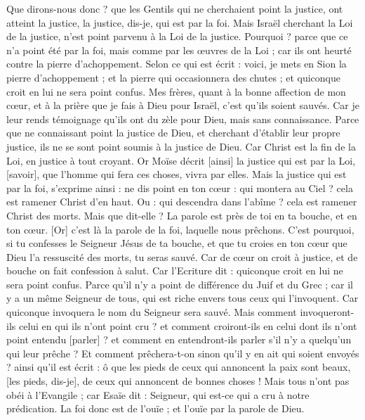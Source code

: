 \begin{multicols}{2}
Que dirons-nous donc ? que les Gentils qui ne cherchaient point la justice, ont atteint la justice, la justice, dis-je, qui est par la foi.
Mais Israël cherchant la Loi de la justice, n'est point parvenu à la Loi de la justice.
Pourquoi ? parce que ce n'a point été par la foi, mais comme par les œuvres de la Loi ; car ils ont heurté contre la pierre d'achoppement.
Selon ce qui est écrit : voici, je mets en Sion la pierre d'achoppement ; et la pierre qui occasionnera des chutes ; et quiconque croit en lui ne sera point confus.
\VerseOne{}Mes frères, quant à la bonne affection de mon cœur, et à la prière que je fais à Dieu pour Israël, c'est qu'ils soient sauvés.
Car je leur rends témoignage qu'ils ont du zèle pour Dieu, mais sans connaissance.
Parce que ne connaissant point la justice de Dieu, et cherchant d'établir leur propre justice, ils ne se sont point soumis à la justice de Dieu.
Car Christ est la fin de la Loi, en justice à tout croyant.
Or Moïse décrit [ainsi] la justice qui est par la Loi, [savoir], que l'homme qui fera ces choses, vivra par elles.
Mais la justice qui est par la foi, s'exprime ainsi : ne dis point en ton cœur : qui montera au Ciel ? cela est ramener Christ d'en haut.
Ou : qui descendra dans l'abîme ? cela est ramener Christ des morts.
Mais que dit-elle ? La parole est près de toi en ta bouche, et en ton cœur. [Or] c'est là la parole de la foi, laquelle nous prêchons.
C'est pourquoi, si tu confesses le Seigneur Jésus de ta bouche, et que tu croies en ton cœur que Dieu l'a ressuscité des morts, tu seras sauvé.
Car de cœur on croit à justice, et de bouche on fait confession à salut.
Car l'Ecriture dit : quiconque croit en lui ne sera point confus.
Parce qu'il n'y a point de différence du Juif et du Grec ; car il y a un même Seigneur de tous, qui est riche envers tous ceux qui l'invoquent.
Car quiconque invoquera le nom du Seigneur sera sauvé.
Mais comment invoqueront-ils celui en qui ils n'ont point cru ? et comment croiront-ils en celui dont ils n'ont point entendu [parler] ? et comment en entendront-ils parler s'il n'y a quelqu'un qui leur prêche ?
Et comment prêchera-t-on sinon qu'il y en ait qui soient envoyés ? ainsi qu'il est écrit : ô que les pieds de ceux qui annoncent la paix sont beaux, [les pieds, dis-je], de ceux qui annoncent de bonnes choses !
Mais tous n'ont pas obéi à l'Evangile ; car Esaïe dit : Seigneur, qui est-ce qui a cru à notre prédication.
La foi donc est de l'ouïe ; et l'ouïe par la parole de Dieu.

\end{multicols}
